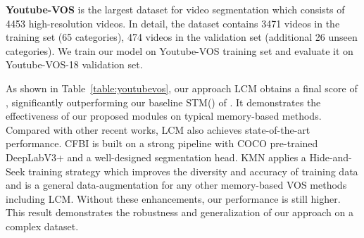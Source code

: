 \documentclass[final]{cvpr}
\begin{document}
\textbf{Youtube-VOS}\cite{youtubevos} is the largest dataset for video segmentation which consists of 4453 high-resolution videos. In detail, the dataset contains 3471 videos in the training set (65 categories), 474 videos in the validation set (additional 26 unseen categories). We train our model on Youtube-VOS training set and evaluate it on Youtube-VOS-18 validation set. 

As shown in Table~\ref{table:youtubevos}, our approach LCM obtains a final score of , significantly outperforming our baseline STM() of . It demonstrates the effectiveness of our proposed modules on typical memory-based methods. Compared with other recent works, LCM also achieves state-of-the-art performance. CFBI\cite{cfbi} is built on a strong pipeline with COCO\cite{coco} pre-trained DeepLabV3+\cite{v3+} and a well-designed segmentation head. KMN applies a Hide-and-Seek training strategy which improves the diversity and accuracy of training data and is a general data-augmentation for any other memory-based VOS methods including LCM.  Without these enhancements, our performance is still higher. 
This result demonstrates the robustness and generalization of our approach on a complex dataset.
\end{document}
